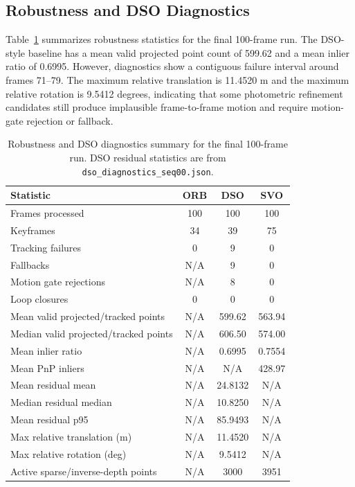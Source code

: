\documentclass[11pt,a4paper]{article}
\newcommand{\NA}{\textsc{N/A}}
\begin{document}
\subsection{Robustness and DSO Diagnostics}

Table~\ref{tab:diagnostics} summarizes robustness statistics for the final 100-frame run. The DSO-style baseline has a mean valid projected point count of 599.62 and a mean inlier ratio of 0.6995. However, diagnostics show a contiguous failure interval around frames 71--79. The maximum relative translation is 11.4520 m and the maximum relative rotation is 9.5412 degrees, indicating that some photometric refinement candidates still produce implausible frame-to-frame motion and require motion-gate rejection or fallback.

\begin{table}[H]
\centering
\small
\caption{Robustness and DSO diagnostics summary for the final 100-frame run. DSO residual statistics are from \texttt{dso\_diagnostics\_seq00.json}.}
\label{tab:diagnostics}
\begin{tabular}{lccc}
\toprule
Statistic & ORB & DSO & SVO \\
\midrule
Frames processed & 100 & 100 & 100 \\
Keyframes & 34 & 39 & 75 \\
Tracking failures & 0 & 9 & 0 \\
Fallbacks & \NA{} & 9 & 0 \\
Motion gate rejections & \NA{} & 8 & 0 \\
Loop closures & 0 & 0 & 0 \\
Mean valid projected/tracked points & \NA{} & 599.62 & 563.94 \\
Median valid projected/tracked points & \NA{} & 606.50 & 574.00 \\
Mean inlier ratio & \NA{} & 0.6995 & 0.7554 \\
Mean PnP inliers & \NA{} & \NA{} & 428.97 \\
Mean residual mean & \NA{} & 24.8132 & \NA{} \\
Median residual median & \NA{} & 10.8250 & \NA{} \\
Mean residual p95 & \NA{} & 85.9493 & \NA{} \\
Max relative translation (m) & \NA{} & 11.4520 & \NA{} \\
Max relative rotation (deg) & \NA{} & 9.5412 & \NA{} \\
Active sparse/inverse-depth points & \NA{} & 3000 & 3951 \\
\bottomrule
\end{tabular}
\end{table}
\end{document}
